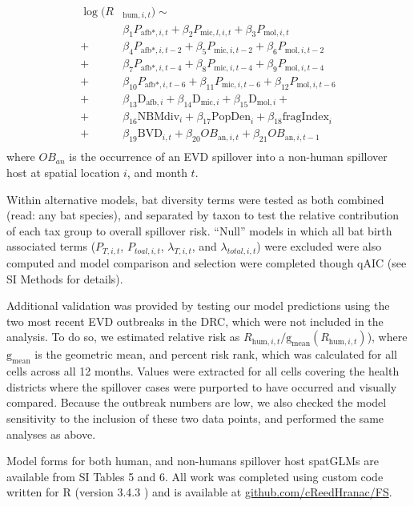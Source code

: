 \documentclass[a4paper,twoside, onecolumn]{article}
\newcommand{\afb}{\mathrm{afb}}
\newcommand{\mic}{\mathrm{mic}}
\newcommand{\mol}{\mathrm{mol}}
\newcommand{\Div}{\mathrm{D}}
\begin{document}
	\[
	\begin{split}
	\log(R&_{\mathrm{hum}, i, t}) \sim \\
	&\beta_1 P_{\afb*, i, t} + \beta_2 P_{\mic, l, i, t} + \beta_3 P_{\mol, i, t} \\
	+ &\beta_4 P_{\afb*, i, t-2} + \beta_5 P_{\mic, i, t-2} + \beta_6 P_{\mol, i, t-2} \\
	+ &\beta_7 P_{\afb*, i, t-4} + \beta_8 P_{\mic, i, t-4} + \beta_9 P_{\mol, i, t-4} \\
	+ &\beta_{10} P_{\afb*, i, t-6} + \beta_{11} P_{\mic, i, t-6} + \beta_{12} P_{\mol, i, t-6} \\
	+ &\beta_{13}\Div_{\afb, i} + \beta_{14}\Div_{\mic, i} + \beta_{15}\Div_{\mol, i} + \\
	+ &\beta_{16} \mathrm{NBM div}_{i} + \beta_{17}\mathrm{PopDen}_{i} + \beta_{18} \mathrm{fragIndex}_{i}\\
	+ &\beta_{19}\mathrm{BVD}_{i,t} + \beta_{20} OB_{\mathrm{an}, i, t} + \beta_{21} OB_{\mathrm{an},i, t-1} \\
	\end{split}
	\]
	where $OB_{an}$ is the occurrence of an EVD spillover into a non-human spillover host at spatial location $i$, and month $t$. \par 
	Within alternative models, bat diversity terms were tested as both combined (read: any bat species), and separated by taxon to test the relative contribution of each tax group to overall spillover risk. ``Null'' models in which all bat birth associated terms ($P_{T,i,t}$, $P_{toal,i,t}$, $\lambda_{T, i, t}$, and $\lambda_{total,i,t}$) were excluded were also computed and model comparison and selection were completed though qAIC (see SI Methods for details).\par
	Additional validation was provided by testing our model predictions using the two most recent EVD outbreaks in the DRC, which were not included in the analysis. To do so, we estimated relative risk as $R_{\mathrm{hum}, i, t}/\mathrm{g_{mean}}(R_{\mathrm{hum}, i, t})$), where $\mathrm{g_{mean}}$ is the geometric mean, and percent risk rank, which was calculated for all cells across all 12 months. Values were extracted for all cells covering the health districts where the spillover cases were purported to have occurred \cite{Barry2018,WHO2018} and visually compared. Because the outbreak numbers are low, we also checked the model sensitivity to the inclusion of these two data points, and performed the same analyses as above.\par
	Model forms for both human, and non-humans spillover host spatGLMs are available from SI Tables 5 and 6. All work was completed using custom code written for R (version 3.4.3 \cite{Team2017}) and is available at \url{github.com/cReedHranac/FS}{}.
\end{document}
